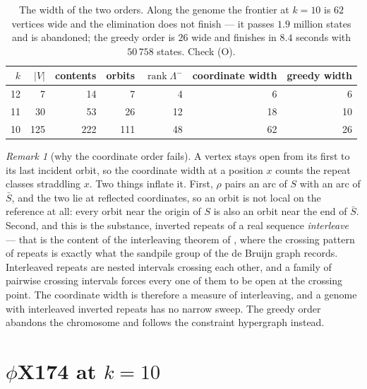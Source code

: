 \documentclass[11pt]{article}
\theoremstyle{plain}
\theoremstyle{definition}
\theoremstyle{remark}
\newtheorem{remark}[theorem]{Remark}
\newcommand{\rank}{\operatorname{rank}}
\newcommand{\Lm}{\Lambda^{-}}
\begin{document}
\begin{table}[t]
\centering
\small
\begin{tabular}{rrrrrrr}
\toprule
$k$ & $|V|$ & contents & orbits & $\rank\Lm$ & coordinate width & greedy width\\
\midrule
12 &   7 &  14 &   7 &  4 &  6 &  6\\
11 &  30 &  53 &  26 & 12 & 18 & 10\\
10 & 125 & 222 & 111 & 48 & 62 & 26\\
\bottomrule
\end{tabular}
\caption{The width of the two orders. Along the genome the frontier at $k=10$ is $62$ vertices
wide and the elimination does not finish --- it passes $1.9$ million states and is abandoned;
the greedy order is $26$ wide and finishes in $8.4$ seconds with $50\,758$ states. Check (O).}
\label{tab:width}
\end{table}

\begin{remark}[why the coordinate order fails]\label{rem:interleave}
A vertex stays open from its first to its last incident orbit, so the coordinate width at a
position $x$ counts the repeat classes straddling $x$. Two things inflate it. First,
$\rho$ pairs an arc of $S$ with an arc of $\bar S$, and the two lie at reflected coordinates,
so an orbit is not local on the reference at all: every orbit near the origin of $S$ is also an
orbit near the end of $\bar S$. Second, and this is the substance, inverted repeats of a real
sequence \emph{interleave} --- that is the content of the interleaving theorem of \cite{Bio1},
where the crossing pattern of repeats is exactly what the sandpile group of the de Bruijn graph
records. Interleaved repeats are nested intervals crossing each other, and a family of
pairwise crossing intervals forces every one of them to be open at the crossing point. The
coordinate width is therefore a measure of interleaving, and a genome with interleaved
inverted repeats has no narrow sweep. The greedy order abandons the chromosome and follows the
constraint hypergraph instead.
\end{remark}

\section{$\phi$X174 at $k=10$}\label{sec:phix}
\end{document}

